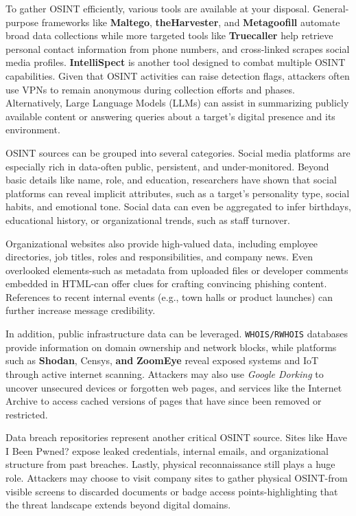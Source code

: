 To gather OSINT efficiently, various tools are available at your disposal. General-purpose frameworks like \textbf{Maltego}, \textbf{theHarvester}, and \textbf{Metagoofill} automate broad data collections while more targeted tools like \textbf{Truecaller} help retrieve personal contact information from phone numbers, and cross-linked scrapes social media profiles. \textbf{IntelliSpect} is another tool designed to combat multiple OSINT capabilities. Given that OSINT activities can raise detection flags, attackers often use VPNs to remain anonymous during collection efforts and phases. Alternatively, Large Language Models (LLMs) can assist in summarizing publicly available content or answering queries about a target's digital presence and its environment.

OSINT sources can be grouped into several categories. Social media platforms are especially rich in data-often public, persistent, and under-monitored. Beyond basic details like name, role, and education, researchers have shown that social platforms can reveal implicit attributes, such as a target's personality type, social habits, and emotional tone. Social data can even be aggregated to infer birthdays, educational history, or organizational trends, such as staff turnover.

Organizational websites also provide high-valued data, including employee directories, job titles, roles and responsibilities, and company news. Even overlooked elements-such as metadata from uploaded files or developer comments embedded in HTML-can offer clues for crafting convincing phishing content. References to recent internal events (e.g., town halls or product launches) can further increase message credibility.

In addition, public infrastructure data can be leveraged. \texttt{WHOIS/RWHOIS} databases provide information on domain ownership and network blocks, while platforms such as \textbf{Shodan}, Censys, \textbf{and} \textbf{ZoomEye} reveal exposed systems and IoT through active internet scanning. Attackers may also use \textit{Google Dorking} to uncover unsecured devices or forgotten web pages, and services like the Internet Archive to access cached versions of pages that have since been removed or restricted.

Data breach repositories represent another critical OSINT source. Sites like Have I Been Pwned? expose leaked credentials, internal emails, and organizational structure from past breaches. Lastly, physical reconnaissance still plays a huge role. Attackers may choose to visit company sites to gather physical OSINT-from visible screens to discarded documents or badge access points-highlighting that the threat landscape extends beyond digital domains.


